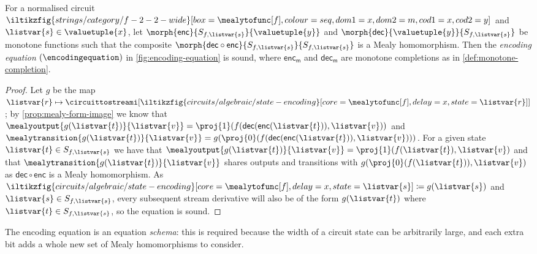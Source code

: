 \documentclass{lmcs}
\begin{document}
\begin{prop}\label{prop:encoding-equation}
    For a normalised circuit \(
    \iltikzfig{strings/category/f-2-2-wide}[box=\mealytofunc[f],colour=seq,dom1=x,dom2=m,cod1=x,cod2=y]
    \) and \(\listvar{s} \in \valuetuple{x}\), let
    \(\morph{\mathsf{enc}}{S_{f,\listvar{s}}}{\valuetuple{y}}\) and
    \(\morph{\mathsf{dec}}{\valuetuple{y}}{S_{f, \listvar{s}}}\) be monotone
    functions such that the composite \(
    \morph{\mathsf{dec} \circ \mathsf{enc}}{S_{f, \listvar{s}}}{S_{f, \listvar{s}}}
    \) is a Mealy homomorphism.
    Then the \emph{encoding equation} \((\encodingequation)\) in
    \autoref{fig:encoding-equation} is sound, where
    \(\mathsf{enc}_\mathsf{m}\) and \(\mathsf{dec}_\mathsf{m}\) are monotone
    completions as in \autoref{def:monotone-completion}.
\end{prop}
\begin{proof}
    Let \(g\) be the map \(\listvar{r} \mapsto
    \circuittostreami[\iltikzfig{circuits/algebraic/state-encoding}[core=\mealytofunc[f],delay=x,state=\listvar{r}]]
    \); by \autoref{prop:mealy-form-image} we know that \(
    \mealyoutput{g(\listvar{t})}{\listvar{v}}
    =
    \proj{1}(f(\mathsf{dec}(\mathsf{enc}(\listvar{t})), \listvar{v}))
    \) and \(
    \mealytransition{g(\listvar{t})}{\listvar{v}}
    =
    g(\proj{0}(f(\mathsf{dec}(\mathsf{enc}(\listvar{t})), \listvar{v})))
    \).
    For a given state \(\listvar{t} \in S_{f, \listvar{s}}\) we have that \(
    \mealyoutput{g(\listvar{t})}{\listvar{v}}
    =
    \proj{1}(f(\listvar{t}), \listvar{v})
    \) and that \(
    \mealytransition{g(\listvar{t})}{\listvar{v}}
    \) shares outputs and transitions with \(
    g(\proj{0}(f(\listvar{t})), \listvar{v})
    \) as \(\mathsf{dec} \circ \mathsf{enc}\) is a Mealy homomorphism.
    As \(
    \iltikzfig{circuits/algebraic/state-encoding}[core=\mealytofunc[f],delay=x,state=\listvar{s}]
    \coloneqq
    g(\listvar{s})
    \) and \(\listvar{s} \in S_{f,\listvar{s}}\),
    every subsequent stream derivative will also be of the form
    \(g(\listvar{t})\) where \(\listvar{t} \in S_{f,\listvar{s}}\), so the
    equation is sound.
\end{proof}

\begin{rem}
    The encoding equation is an equation \emph{schema}: this is required because
    the width of a circuit state can be arbitrarily large, and each extra bit
    adds a whole new set of Mealy homomorphisms to consider.
\end{rem}
\end{document}
